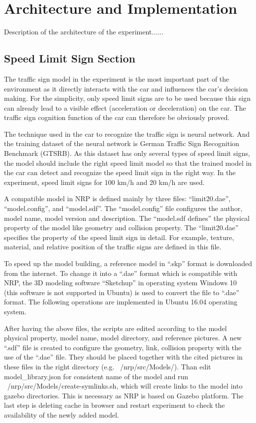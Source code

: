 
\section{Architecture and Implementation}

Description of the architecture of the experiment......

\subsection{Speed Limit Sign Section}

The traffic sign model in the experiment is the most important part of the environment as it directly interacts with the car and influences the car’s decision making. For the simplicity, only speed limit signs are to be used because this sign can already lead to a visible effect (acceleration or deceleration) on the car. The traffic sign cognition function of the car can therefore be obviously proved. 

The technique used in the car to recognize the traffic sign is neural network. And the training dataset of the neural network is German Traffic Sign Recognition Benchmark (GTSRB). As this dataset has only several types of speed limit signs, the model should include the right speed limit model so that the trained model in the car can detect and recognize the speed limit sign in the right way. In the experiment, speed limit signs for 100 km/h and 20 km/h are used.

A compatible model in NRP is defined mainly by three files: ``limit20.dae'', ``model.config'', and ``model.sdf''. The ``model.config'' file configures the author, model name, model version and description. The ``model.sdf defines'' the physical property of the model like geometry and collision property. The ``limit20.dae'' specifies the property of the speed limit sign in detail. For example, texture, material, and relative position of the traffic signs are defined in this file.

To speed up the model building, a reference model in ``.skp'' format is downloaded from the internet. To change it into a ``.dae'' format which is compatible with NRP, the 3D modeling software ``Sketchup'' in operating system Windows 10 (this software is not supported in Ubuntu) is used to convert the file to ``.dae'' format. The following operations are implemented in Ubuntu 16.04 operating system. 
                                                                                  
After having the above files, the scripts are edited according to the model physical property, model name, model directory, and reference pictures. A new ``.sdf'' file is created to configure the geometry, link, collision property with the use of the ``.dae'' file. They should be placed together with the cited pictures in these files in the right directory (e.g. ~/nrp/src/Models/). Than edit model\_library.json for consistent name of the model and run ~/nrp/src/Models/create-symlinks.sh, which will create links to the model into gazebo directories. This is necessary as NRP is based on Gazebo platform. The last step is deleting cache in browser and restart experiment to check the availability of the newly added model.




